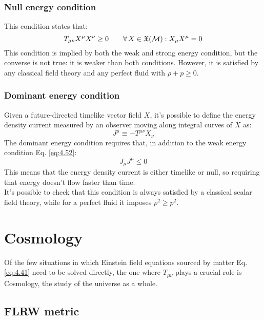 \subsubsection{Null energy condition}

This condition states that:
\begin{equation}
  T_{\mu \nu} X^\mu X^\nu \ge 0
  \qquad
  \forall\, X \in \mathfrak{X}(\mathcal{M}) : X_\mu X^\mu = 0
  \label{eq:4.54}
\end{equation}
This condition is implied by both the weak and strong energy condition, but the converse is not true: it is weaker than both conditions. However, it is satisfied by any classical field theory and any perfect fluid with $ \rho + p \ge 0 $.

\subsubsection{Dominant energy condition}

Given a future-directed timelike vector field $ X $, it's possible to define the energy density current measured by an observer moving along integral curves of $ X $ as:
\begin{equation*}
  J^\mu \equiv - T^{\mu \nu} X_\nu
\end{equation*}
The dominant energy condition requires that, in addition to the weak energy condition Eq. \ref{eq:4.52}:
\begin{equation}
  J_\mu J^\mu \le 0
  \label{eq:4.55}
\end{equation}
This means that the energy density current is either timelike or null, so requiring that energy doesn't flow faster than time.\\
It's possible to check that this condition is always satisfied by a classical scalar field theory, while for a perfect fluid it imposes $ \rho^2 \ge p^2 $.

\section{Cosmology}

Of the few situations in which Einstein field equations sourced by matter Eq. \ref{eq:4.41} need to be solved directly, the one where $ T_{\mu \nu} $ plays a crucial role is Cosmology, the study of the universe as a whole.

\subsection{FLRW metric}

